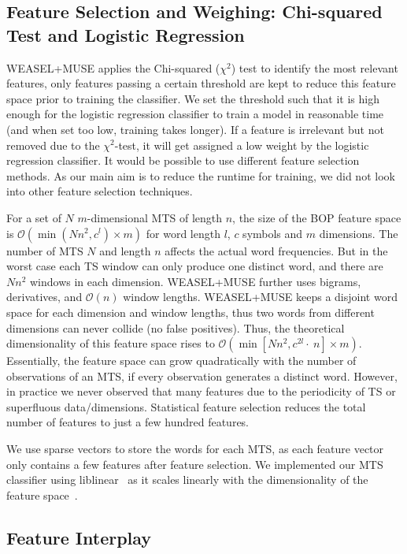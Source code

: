 \documentclass[sigconf]{acmart}
\begin{document}
\subsection{Feature Selection and Weighing: Chi-squared Test and Logistic Regression}\label{subsec:Chi-Squared-Test}

WEASEL+MUSE applies the Chi-squared ($\chi^{2}$) test to identify the most relevant features, only features passing a certain threshold are kept to reduce this feature space prior to training the classifier. We set the threshold such that it is high enough for the logistic regression classifier to train a model in reasonable time (and when set too low, training takes longer). If a feature is irrelevant but not removed due to the $\chi^{2}$-test, it will get assigned a low weight by the logistic regression classifier. It would be possible to use different feature selection methods. As our  main aim is to reduce the runtime for training, we did not look into other feature selection techniques.

For a set of $N$ $m$-dimensional MTS of length $n$, the size of the BOP feature space is $\mathcal{O}(\min(Nn^2, c^l)\times m)$ for word length $l$, $c$  symbols and $m$ dimensions. The number of MTS $N$ and length $n$ affects the actual word frequencies. But in the worst case each TS window can only produce one distinct word, and there are $Nn^2$ windows in each dimension. WEASEL+MUSE further uses bigrams, derivatives, and $\mathcal{O}(n)$ window lengths. WEASEL+MUSE keeps a disjoint word space for each dimension and window lengths, thus two words from different dimensions can never collide (no false positives). Thus, the theoretical dimensionality of this feature space rises to $\mathcal{O}(\min [Nn^2,c^{2l}\cdot~n] \times m)$. Essentially, the feature space can grow quadratically with the number of observations of an MTS, if every observation generates a distinct word. However, in practice we never observed that many features due to the periodicity of TS or superfluous data/dimensions. Statistical feature selection reduces the total number of features to just a few hundred features.

We use sparse vectors to store the words for each MTS, as each feature vector only contains a few features after feature selection. We implemented our MTS classifier using liblinear~\cite{fan2008liblinear} as it scales linearly with the dimensionality of the feature space~\cite{ng2004feature}.

\subsection{Feature Interplay}\label{subsec:Feature-interplay}
\end{document}
